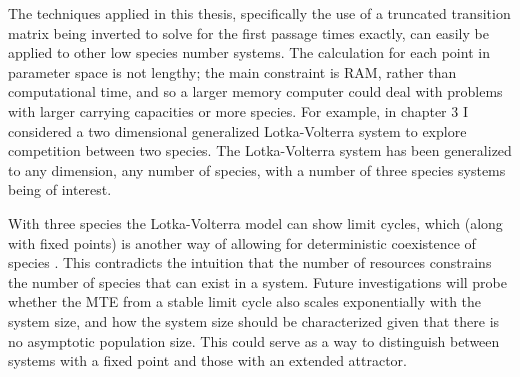 The techniques applied in this thesis, specifically the use of a truncated transition matrix being inverted to solve for the first passage times exactly, can easily be applied to other low species number systems. 
The calculation for each point in parameter space is not lengthy; the main constraint is RAM, rather than computational time, and so a larger memory computer could deal with problems with larger carrying capacities or more species. %
For example, in chapter 3 I considered a two dimensional generalized Lotka-Volterra system to explore competition between two species. 
The Lotka-Volterra system has been generalized to any dimension, any number of species, with a number of three species systems being of interest. 
\iffalse
From the two dimensional Lotka-Volterra system one arrives at the predator-prey system by choosing the parameters correctly. 
One can also move to the third dimension, in order to account for a third species in the system. 
This allows for the investigation of many systems of interest, with much more diversity. 
The simplest extension in this regard would be to have three species all with overlapping niches \cite{MacArthur1970}. 
I could observe how a species whose niche is situated between those of two others (such that they each overlap with the first species but not with each other) would go extinct more readily as the overlap of the encroaching species is increased. 
\fi
With three species the Lotka-Volterra model can show limit cycles, which (along with fixed points) is another way of allowing for deterministic coexistence of species \cite{Smale1976,Armstrong1976}. 
This contradicts the intuition that the number of resources constrains the number of species that can exist in a system. 
Future investigations will probe whether the MTE from a stable limit cycle also scales exponentially with the system size, and how the system size should be characterized given that there is no asymptotic population size. 
This could serve as a way to distinguish between systems with a fixed point and those with an extended attractor. 

